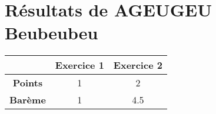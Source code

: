 \documentclass[12pt]{article}
\begin{document}
        
\section{Résultats de AGEUGEU Beubeubeu}


    \begin{center}
        
\begin{tabular}{|c|c|c|}
      \hline
       & \bfseries Exercice 1  & \bfseries Exercice 2  \\
      \hline
      \bfseries Points  & 1 & 2 \\
      \hline
      \bfseries Barème  & 1 & 4.5 \\
      \hline
\end{tabular}

    \end{center}

\end{document}
